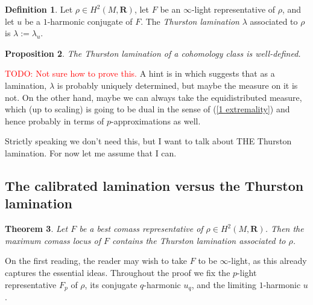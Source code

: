 \documentclass[reqno,11pt]{amsart}
\newcommand{\RR}{\mathbf{R}}
\newcommand{\dfn}[1]{\emph{#1}\index{#1}}
\newtheorem{theorem}{Theorem}[section]
\newtheorem{proposition}[theorem]{Proposition}
\theoremstyle{definition}
\newtheorem{definition}[theorem]{Definition}
\numberwithin{equation}{section}
\newcommand\todo[1]{\textcolor{red}{TODO: #1}}
\begin{document}
\begin{definition}
Let $\rho \in H^2(M, \RR)$, let $F$ be an $\infty$-light representative of $\rho$, and let $u$ be a $1$-harmonic conjugate of $F$.
The \dfn{Thurston lamination} $\lambda$ associated to $\rho$ is $\lambda := \lambda_u$.
\end{definition}

\begin{proposition}
The Thurston lamination of a cohomology class is well-defined.
\end{proposition}

\todo{Not sure how to prove this.}
A hint is in \cite[Remark 2.8]{Mazon14} which suggests that as a lamination, $\lambda$ is probably uniquely determined, but maybe the measure on it is not.
On the other hand, maybe we can always take the equidistributed measure, which (up to scaling) is going to be dual in the sense of (\ref{1 extremality}) and hence probably in terms of $p$-approximations as well.

Strictly speaking we don't need this, but I want to talk about THE Thurston lamination.
For now let me assume that I can.

\subsection{The calibrated lamination versus the Thurston lamination}
\begin{theorem}\label{MCL contains Thurston}
Let $F$ be a best comass representative of $\rho \in H^2(M, \RR)$.
Then the maximum comass locus of $F$ contains the Thurston lamination associated to $\rho$.
\end{theorem}

On the first reading, the reader may wish to take $F$ to be $\infty$-light, as this already captures the essential ideas.
Throughout the proof we fix the $p$-light representative $F_p$ of $\rho$, its conjugate $q$-harmonic $u_q$, and the limiting $1$-harmonic $u$.
\end{document}

